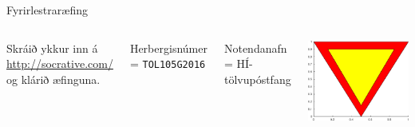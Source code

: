 \documentclass[handout]{beamer}
\begin{document}
\begin{frame}{Fyrirlestraræfing}
\begin{columns}
Skráið ykkur inn á \url{http://socrative.com/} og klárið æfinguna.

Herbergisnúmer = \texttt{TOL105G2016}

Notendanafn = HÍ-tölvupóstfang
\begin{center}
\includegraphics[width=0.8\linewidth]{../Pics/bidskylda}
\end{center}
\end{columns}
\end{frame}
\end{document}
